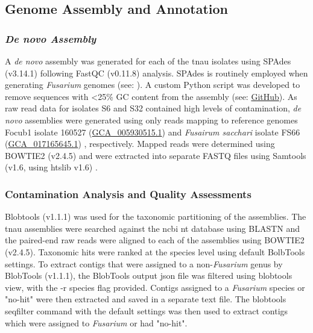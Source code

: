 \subsection{Genome Assembly and Annotation}

\subsubsection{\textit{De novo Assembly}}
A \textit{de novo} assembly was generated for each of the \ac{tnau} isolates using SPAdes (v3.14.1) \parencite{Prjibelski2020} following FastQC (v0.11.8) analysis. SPAdes is routinely employed when generating \textit{Fusarium} genomes
(see: \textcite{Armitage2018, Hudson2020, Tanaka2022}). A custom Python script was developed to remove sequences with <25\% GC content from the assembly (see: \href{https://github.com/JamiePike/NewTools-Project/blob/master/bin/gcTrimmer.py}{GitHub}). As raw read data for isolates S6 and S32 contained high levels of contamination, \textit{de novo} assemblies were generated using only reads mapping to reference genomes \ac{Focub1} isolate 160527 (\href{https://www.ncbi.nlm.nih.gov/datasets/genome/GCA_005930515.1/}{GCA\_005930515.1}) \parencite{Asai2019} and \textit{Fusairum sacchari} isolate FS66 (\href{https://www.ncbi.nlm.nih.gov/datasets/genome/GCA_017165645.1/}{GCA\_017165645.1}) \parencite{Cui2021}, respectively. Mapped reads were determined using BOWTIE2 (v2.4.5) and were extracted into separate FASTQ files using Samtools (v1.6, using htslib v1.6) \parencite{Danecek2021}. 

\subsubsection{Contamination Analysis and Quality Assessments}
Blobtools (v1.1.1) \parencite{Laetsch2017} was used for the taxonomic partitioning of the assemblies. The \ac{tnau} assemblies were searched against the \ac{ncbi} nt database using BLASTN and the paired-end raw reads were aligned to each of the assemblies using BOWTIE2 (v2.4.5). Taxonomic hits were ranked at the species level using default BolbTools settings. To extract contigs that were assigned to a non-\textit{Fusarium} genus by BlobTools (v1.1.1), the BlobTools output json file was filtered using blobtools view, with the -r species flag provided. Contigs assigned to a \textit{Fusarium} species or "no-hit" were then extracted and saved in a separate text file. The blobtools seqfilter command with the default settings was then used to extract contigs which were assigned to \textit{Fusarium} or had "no-hit".

